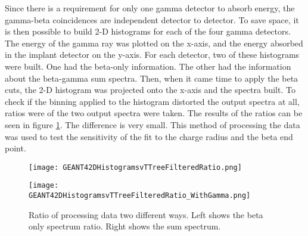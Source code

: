 \documentclass[../MaxHughesThesis.tex]{subfiles}
\begin{document}
Since there is a requirement for only one gamma detector to absorb energy, the gamma-beta coincidences are independent detector to detector.
To save space, it is then possible to build 2-D histograms for each of the four gamma detectors.
The energy of the gamma ray was plotted on the x-axis, and the energy absorbed in the implant detector on the y-axis. 
For each detector, two of these histograms were built.
One had the beta-only information.
The other had the information about the beta-gamma sum spectra.
Then, when it came time to apply the beta cuts, the 2-D histogram was projected onto the x-axis and the spectra built.
To check if the binning applied to the histogram distorted the output spectra at all, ratios were of the two output spectra were taken.
The results of the ratios can be seen in figure \ref{fig:histogramtottreeratio}.
The difference is very small.
This method of processing the data was used to test the sensitivity of the fit to the charge radius and the beta end point.

\begin{figure}
    \centering
    \begin{minipage}{0.50\textwidth}
        \centerline{\texttt{[image: GEANT42DHistogramsvTTreeFilteredRatio.png]}}
    \end{minipage}\hfill
    \begin{minipage}{0.50\textwidth}
        \centerline{\texttt{[image: GEANT42DHistogramsvTTreeFilteredRatio\_WithGamma.png]}}
    \end{minipage}
    \caption{Ratio of processing data two different ways.
	     Left shows the beta only spectrum ratio.
	     Right shows the sum spectrum.}
    \label{fig:histogramtottreeratio}
\end{figure}
\end{document}
